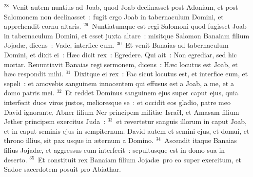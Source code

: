 ${}^{28}$~Venit autem nuntius ad Joab, quod Joab declinasset post Adoniam, et post Salomonem non declinasset~: fugit ergo Joab in tabernaculum Domini, et apprehendit cornu altaris.
${}^{29}$~Nuntiatumque est regi Salomoni quod fugisset Joab in tabernaculum Domini, et esset juxta altare~: misitque Salomon Banaiam filium Jojad\ae , dicens~: Vade, interfice eum.
${}^{30}$~Et venit Banaias ad tabernaculum Domini, et dixit ei~: H\ae c dicit rex~: Egredere. Qui ait~: Non egrediar, sed hic moriar. Renuntiavit Banaias regi sermonem, dicens~: H\ae c locutus est Joab, et h\ae c respondit mihi.
${}^{31}$~Dixitque ei rex~: Fac sicut locutus est, et interfice eum, et sepeli~: et amovebis sanguinem innocentem qui effusus est a Joab, a me, et a domo patris mei.
${}^{32}$~Et reddet Dominus sanguinem ejus super caput ejus, quia interfecit duos viros justos, melioresque se~: et occidit eos gladio, patre meo David ignorante, Abner filium Ner principem militi\ae\ Isra\"el, et Amasam filium Jether principem exercitus Juda~:
${}^{33}$~et revertetur sanguis illorum in caput Joab, et in caput seminis ejus in sempiternum. David autem et semini ejus, et domui, et throno illius, sit pax usque in \ae ternum a Domino.
${}^{34}$~Ascendit itaque Banaias filius Jojad\ae , et aggressus eum interfecit~: sepultusque est in domo sua in deserto.
${}^{35}$~Et constituit rex Banaiam filium Jojad\ae\ pro eo super exercitum, et Sadoc sacerdotem posuit pro Abiathar.


